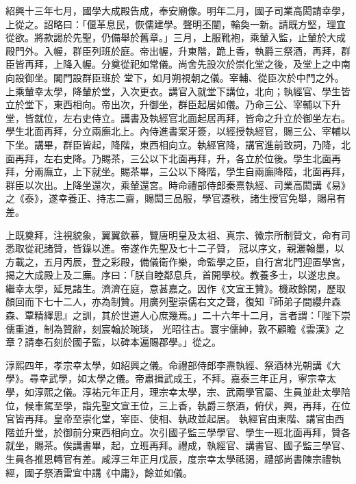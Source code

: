 \begin{pinyinscope}
 紹興十三年七月，國學大成殿告成，奉安廟像。明年二月，國子司業高閎請幸學，上從之。詔略曰：「偃革息民，恢儒建學。聲明丕闡，輪奐一新。請既方堅，理宜從欲。將款謁於先聖，仍備舉於舊章。」三月，上服靴袍，乘輦入監，止輦於大成殿門外。入幄，群臣列班於庭。帝出幄，升東階，跪上香，執爵三祭酒，再拜，群臣皆再拜，上降入幄。分奠從祀如常儀。尚舍先設次於崇化堂之後，及堂上之中南向設御坐。閣門設群臣班於
 堂下，如月朔視朝之儀。宰輔、從臣次於中門之外。上乘輦幸太學，降輦於堂，入次更衣。講官入就堂下講位，北向；執經官、學生皆立於堂下，東西相向。帝出次，升御坐，群臣起居如儀。乃命三公、宰輔以下升堂，皆就位，左右史侍立。講書及執經官北面起居再拜，皆命之升立於御坐左右。學生北面再拜，分立兩廡北上。內侍進書案牙簽，以經授執經官，賜三公、宰輔以下坐。講畢，群臣皆起，降階，東西相向立。執經官降，講官進前致詞，乃降，北
 面再拜，左右史降。乃賜茶，三公以下北面再拜，升，各立於位後。學生北面再拜，分兩廡立，上下就坐。賜茶畢，三公以下降階，學生自兩廡降階，北面再拜，群臣以次出。上降坐還次，乘輦還宮。時命禮部侍郎秦熹執經、司業高閎講《易》之《泰》，遂幸養正、持志二齋，賜閎三品服，學官遷秩，諸生授官免舉，賜帛有差。



 上既奠拜，注視貌象，翼翼欽慕，覽唐明皇及太祖、真宗、徽宗所制贊文，命有司悉取從祀諸贊，皆錄以進。帝遂作先聖及七十二子贊，
 冠以序文，親灑翰墨，以方載之，五月丙辰，登之彩殿，備儀衛作樂，命監學之臣，自行宮北門迎置學宮，揭之大成殿上及二廡。序曰：「朕自睦鄰息兵，首開學校。教養多士，以遂忠良。繼幸太學，延見諸生。濟濟在庭，意甚嘉之。因作《文宣王贊》。機政餘閑，歷取顏回而下七十二人，亦為制贊。用廣列聖崇儒右文之聲，復知『師弟子間纓弁森森、覃精繹思』之訓，其於世道人心庶幾焉。」二十六年十二月，言者謂：「陛下崇儒重道，制為贊辭，刻宸翰於琬琰，
 光昭往古。寰宇儒紳，敦不顧瞻《雲漢》之章？請奉石刻於國子監，以碑本遍賜郡學。」從之。



 淳熙四年，孝宗幸太學，如紹興之儀。命禮部侍郎李燾執經、祭酒林光朝講《大學》。尋幸武學，如太學之儀。帝肅揖武成王，不拜。嘉泰三年正月，寧宗幸太學，如淳熙之儀。淳祐元年正月，理宗幸太學，宗、武兩學官屬、生員並赴太學陪位，候車駕至學，詣先聖文宣王位，三上香，執爵三祭酒，俯伏，興，再拜，在位官皆再拜。皇帝至崇化堂，宰臣、使相、執政並起居。
 執經官由東階、講官由西階並升堂，於御前分東西相向立。次引國子監三學學官、學生一班北面再拜，贊各就坐，賜茶。俟講書畢，起，立班再拜。禮成，執經官、講書官、國子監三學官、生員各推恩轉官有差。咸淳三年正月戊辰，度宗幸太學祗謁，禮部尚書陳宗禮執經，國子祭酒雷宜中講《中庸》，餘並如儀。




\end{pinyinscope}
